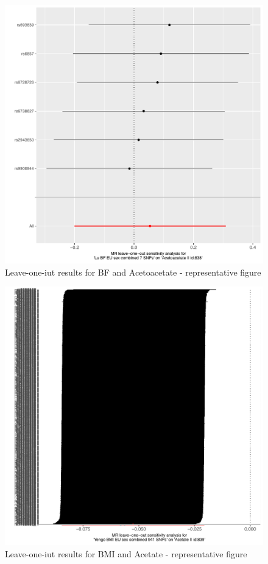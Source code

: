 \documentclass[11pt,twoside]{bristolthesis}
\begin{document}
\begin{figure}
\includegraphics[width=1\linewidth]{data/chapter5/figures/leaveoneout_BF_representative_figure} \caption{Leave-one-iut results for BF and Acetoacetate - representative figure}\label{fig:appendix-chapter5-figure-leaveoneout-BF-representative-figure}
\end{figure}
\begin{figure}
\includegraphics[width=1\linewidth]{data/chapter5/figures/leaveoneout_BMI_representative_figure} \caption{Leave-one-iut results for BMI and Acetate - representative figure}\label{fig:appendix-chapter5-figure-leaveoneout-BMI-representative-figure}
\end{figure}
\end{document}

